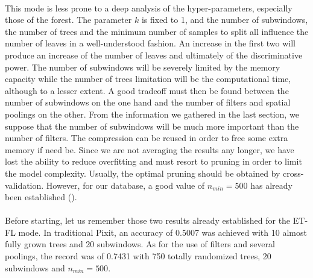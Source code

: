 \documentclass[a4paper]{report}
\begin{document}
	\paragraph{}
	This mode is less prone to a deep analysis of the hyper-parameters, especially those of the forest. The parameter $k$ is fixed to 1, and the number of subwindows, the number of trees and the minimum number of samples to split all influence the number of leaves in a well-understood fashion. An increase in the first two will produce an increase of the number of leaves and ultimately of the discriminative power. The number of subwindows will be severely limited by the memory capacity while the number of trees limitation will be the computational time, although to a lesser extent. A good tradeoff must then be found between the number of subwindows on the one hand and the number of filters and spatial poolings on the other. From the information we gathered in the last section, we suppose that the number of subwindows will be much more important than the number of filters. The compression can be reused in order to free some extra memory if need be.
	Since we are not averaging the results any longer, we have lost the ability to reduce overfitting and must resort to pruning in order to limit the model complexity. Usually, the optimal pruning should be obtained by cross-validation. However, for our database, a good value of $n_{min} = 500$ has already been established (\cite{base}). 
	\paragraph{}
	Before starting, let us remember those two results already established for the ET-FL mode. In traditional Pixit, an accuracy of 0.5007 was achieved with 10 almost fully grown trees and 20 subwindows. As for the use of filters and several poolings, the record was of 0.7431 with 750 totally randomized trees, 20 subwindows and $n_{min} = 500$. 
		
	
\end{document}
